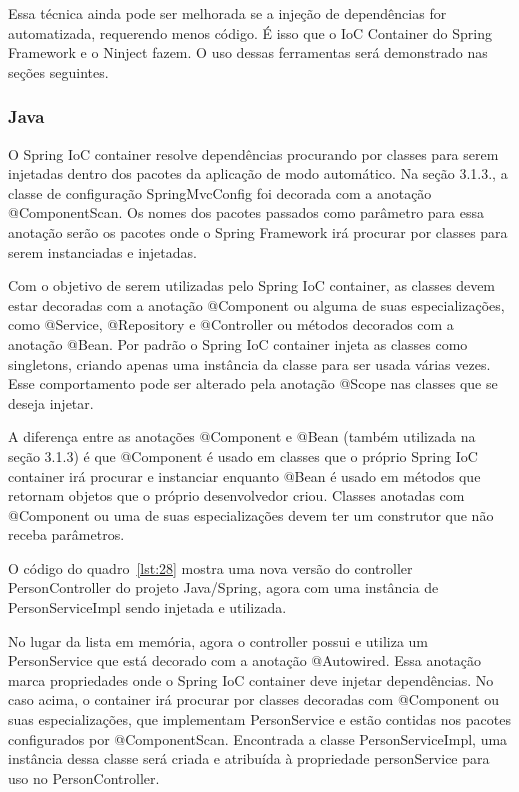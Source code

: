 \documentclass[a4paper,12pt]{article}
\newcommand{\javacode}[3] {
	
	\FloatBarrier
}
\begin{document}
Essa técnica ainda pode ser melhorada se a injeção de dependências for automatizada, requerendo menos código. É isso que o IoC Container do Spring Framework e o Ninject fazem. O uso dessas ferramentas será demonstrado nas seções seguintes.

\subsubsection{Java}

O Spring IoC container resolve dependências procurando por classes para serem injetadas dentro dos pacotes da aplicação de modo automático. Na seção 3.1.3., a classe de configuração SpringMvcConfig foi decorada com a anotação @ComponentScan. Os nomes dos pacotes passados como parâmetro para essa anotação serão os pacotes onde o Spring Framework irá procurar por classes para serem instanciadas e injetadas.

Com o objetivo de serem utilizadas pelo Spring IoC container, as classes devem estar decoradas com a anotação @Component ou alguma de suas especializações, como @Service, @Repository e @Controller ou métodos decorados com a anotação @Bean. Por padrão o Spring IoC container injeta as classes como singletons, criando apenas uma instância da classe para ser usada várias vezes. Esse comportamento pode ser alterado pela anotação @Scope nas classes que se deseja injetar.

A diferença entre as anotações @Component e @Bean (também utilizada na seção 3.1.3) é que @Component é usado em classes que o próprio Spring IoC container irá procurar e instanciar enquanto @Bean é usado em métodos que retornam objetos que o próprio desenvolvedor criou. Classes anotadas com @Component ou uma de suas especializações devem ter um construtor que não receba parâmetros.

O código do quadro~\ref{lst:28} mostra uma nova versão do controller PersonController do projeto Java/Spring, agora com uma instância de PersonServiceImpl sendo injetada e utilizada.

\javacode{code/28.txt}{PersonController utilizando PersonService no projeto Java/Spring}{lst:28}

No lugar da lista em memória, agora o controller possui e utiliza um PersonService que  está decorado com a anotação @Autowired. Essa anotação marca propriedades onde o Spring IoC container deve injetar dependências. No caso acima, o container irá procurar por classes decoradas com @Component ou suas especializações, que implementam PersonService e estão contidas nos pacotes configurados por @ComponentScan. Encontrada a classe PersonServiceImpl, uma instância dessa classe será criada e atribuída à propriedade personService para uso no PersonController.
\end{document}
